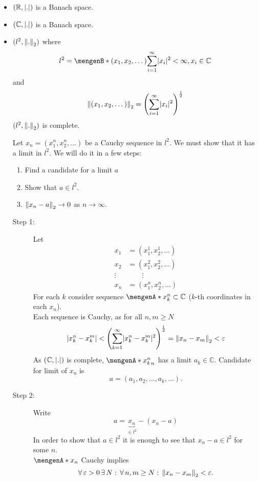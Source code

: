 \begin{beispiele}
	\begin{itemize}
		\item $(\mathbb{R},\lvert.\rvert)$ is a Banach space.
		\item $(\mathbb{C},\lvert.\rvert)$ is a Banach space.
		\item $(l^2,\norm{.}_2)$ where
		\[
			l^2= \set[(x_1,x_2,\dots)]{\sum^{\infty}_{i=1} \abs{x_i}^2 < \infty, x_i \in \mathbb{C}}
		\]
		and 
		\[
			\norm{(x_1,x_2,\dots)}_2 = \left( \sum_{i=1}^{\infty} \abs{x_i}^2 \right)^{\frac{1}{2}}
		\]
		$(l^2,\norm{.}_2)$ is complete.
		\begin{beweis}
			Let $x_n = (x_1^n,x_2^n,\dots)$ be a Cauchy sequence in $l^2$. We must show that it has a limit in $l^2$. We will do it in a few steps:
			\begin{enumerate}[Step 1:]
				\item Find a candidate for a limit $a$
				\item Show that $a \in l^2$.
				\item $\norm{x_n - a }_2 \to 0$ as $n \to \infty$.
			\end{enumerate}
			\begin{description}
				\item[Step 1:] Let
				\begin{align*}
					x_1 &= (x_1^1,x_2^1, \dots) \\
					x_2 &= (x_1^2,x_2^2, \dots) \\
					\vdots & \qquad \vdots \\
					x_n &= (x_1^n,x_2^n, \dots)
				\end{align*}
				For each $k$ consider sequence $\set{x_k^n} \subset \mathbb{C}$ ($k$-th coordinates in each $x_n$). \\
				Each sequence is Cauchy, as for all $n,m \geq N$
				\[
					\abs{x_k^n-x_k^m} < \left( \sum_{k=1}^{\infty} \abs{x_k^n-x_k^m}^2 \right)^{\frac{1}{2}} = \norm{x_n-x_m}_2 < \varepsilon
				\]
				As $(\mathbb{C}, \lvert.\rvert)$ is complete, $\set{x_k^n}_n$ has a limit $a_k \in \mathbb{C}$. Candidate for limit of $x_n$ is 
				\[
					a= (a_1,a_2, \dots, a_k, \dots).
				\]
				\item[Step 2:] Write 
				\[
					a = \underset{\in l^2}{\underbrace{x_n}} - (x_n - a)
				\]
				In order to show that $a \in l^2$ it is enough to see that $x_n - a \in l^2$ for some $n$. \\
				$\set{x_n}$ Cauchy implies
				\[
					\forall\, \varepsilon>0 \,\exists\,N: \,\forall\, n,m \geq N: \,\norm{x_n-x_m}_2 < \varepsilon.
\]
\end{description}
\end{beweis}
\end{itemize}
\end{beispiele}
